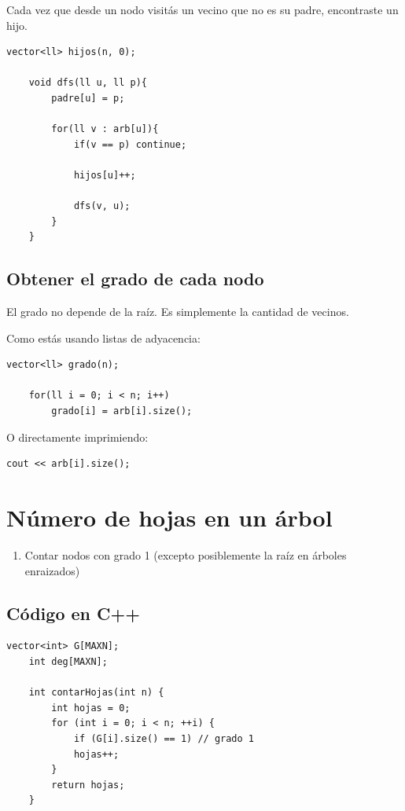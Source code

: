 Cada vez que desde un nodo visitás un vecino que no es su padre, encontraste un hijo.

\begin{lstlisting}[caption=Obtener cantidad de hijos]
	vector<ll> hijos(n, 0);
	
	void dfs(ll u, ll p){
		padre[u] = p;
		
		for(ll v : arb[u]){
			if(v == p) continue;
			
			hijos[u]++;
			
			dfs(v, u);
		}
	}
\end{lstlisting}

\subsection*{Obtener el grado de cada nodo}

El grado no depende de la raíz. Es simplemente la cantidad de vecinos.

Como estás usando listas de adyacencia:

\begin{lstlisting}[caption=Obtener grado de un nodo]
	vector<ll> grado(n);
	
	for(ll i = 0; i < n; i++)
		grado[i] = arb[i].size();
\end{lstlisting}

O directamente imprimiendo:

\begin{lstlisting}[caption=Imprimir grado]
	cout << arb[i].size();
\end{lstlisting}

\section{Número de hojas en un árbol}

\begin{enumerate}
	\item Contar nodos con grado 1 (excepto posiblemente la raíz en árboles enraizados)
\end{enumerate}

\subsection*{Código en C++}

\begin{lstlisting}[caption=Contar hojas en un árbol]
	vector<int> G[MAXN];
	int deg[MAXN];
	
	int contarHojas(int n) {
		int hojas = 0;
		for (int i = 0; i < n; ++i) {
			if (G[i].size() == 1) // grado 1
			hojas++;
		}
		return hojas;
	}
\end{lstlisting}

